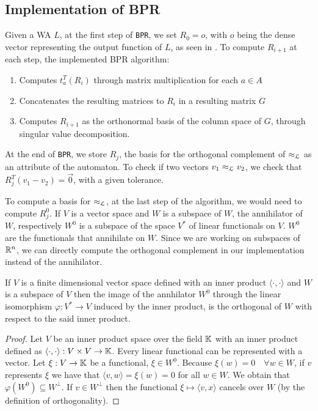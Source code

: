 
\subsection{Implementation of BPR}
Given a WA $L$, at the first step of \texttt{BPR}, we set $R_0 = o$, 
with $o$ being the dense vector representing the output function 
of $L$, as seen in \cite{BONCHI201277}.
To compute $R_{i+1}$ at each step, the implemented BPR algorithm:
\begin{enumerate}
    \item Computes $t_a^T(R_i)$ through matrix multiplication for each $a \in A$
    \item Concatenates the resulting matrices to $R_i$ in a resulting matrix $G$ 
    \item Computes $R_{i+1}$ as the orthonormal basis of the column space of $G$, through singular 
    value decomposition.
\end{enumerate}

At the end of \texttt{BPR}, we store $R_j$, the basis for the orthogonal complement
of $\approx_{\mathcal{L}}$ as an attribute of the automaton. To check if two vectors $v_1 \approx_{\mathcal{L}} v_2$,
we check that $R_j^T(v_1 - v_2) = \vec{0}$, with a given tolerance.


To compute a basis for $\approx_{\mathcal{L}}$, at the last step of the algorithm,
we would need to compute $R_j^0$.
If $V$ is a vector space and $W$ is a
subspace of $W$, the annihilator of $W$, respectively $W^0$ is 
a subspace of the space $V^*$ of linear functionals on $V$.
$W^0$ are the functionals that annihilate on $W$. Since 
we are working on subspaces of $\mathbb{R}^n$, we can directly compute 
the orthogonal complement in our implementation instead of the
annihilator.


\begin{prop}
  If $V$ is a finite dimensional vector space defined with an inner product
  $\langle \cdot , \cdot \rangle$ and $W$ is a subspace of $V$
  then the image of the annhilator $W^0$ through the linear 
  isomorphism $\varphi: V^* \to V$ induced by the inner product, 
  is the orthogonal of $W$ with respect to the said inner product.
\end{prop}

\begin{proof}
  Let $V$ be an inner product space over the field $\mathbb{K}$ with an inner product defined as
  $\langle \cdot , \cdot \rangle : V \times V \to \mathbb{K}$. 
  Every linear functional can be 
  represented with a vector. Let $\xi : V \to \mathbb{K}$ be a functional, 
  $\xi \in  W^0$. Because $\xi(w)=0 \quad \forall  w \in W$, 
  if $v$ represents $\xi$ we have that $\langle v, w \rangle =\xi(w)=0$ for all $w \in W$. 
  We obtain that $\varphi(W^0) \subseteq W^{\perp}$.
  If $v \in W^\perp$  
  then the functional $\xi \mapsto \langle v, x \rangle$ cancels over $W$ 
  (by the definition of orthogonality).
\end{proof}

